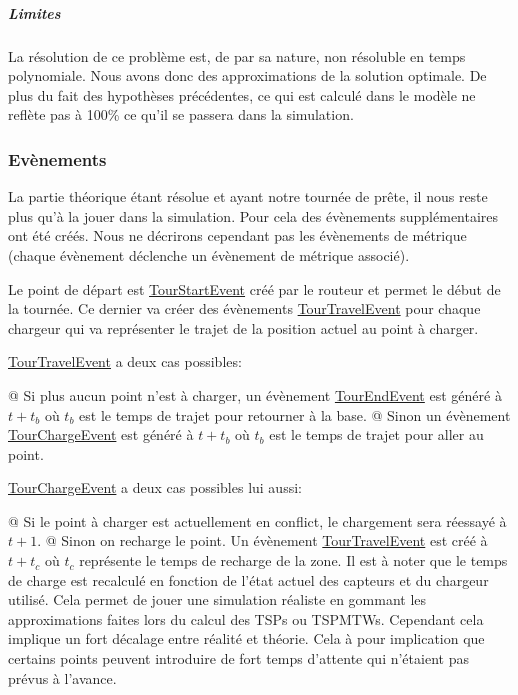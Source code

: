\documentclass[final]{polytech/polytech}
\newcommand{\klass}[1]{\hyperref[class:#1]{#1}}
\begin{document}
					\subparagraph{Limites}
						La résolution de ce problème est, de par sa nature, non résoluble en temps polynomiale.
						Nous avons donc des approximations de la solution optimale.
						De plus du fait des hypothèses précédentes, ce qui est calculé dans le modèle ne reflète pas à 100\% ce qu'il se passera dans la simulation.
			
			\subsubsection{Evènements}
				La partie théorique étant résolue et ayant notre tournée de prête, il nous reste plus qu'à la jouer dans la simulation.
				Pour cela des évènements supplémentaires ont été créés.
				Nous ne décrirons cependant pas les évènements de métrique (chaque évènement déclenche un évènement de métrique associé).
				
				Le point de départ est \klass{TourStartEvent} créé par le routeur et permet le début de la tournée.
				Ce dernier va créer des évènements \klass{TourTravelEvent} pour chaque chargeur qui va représenter le trajet de la position actuel au point à charger.
				
				\klass{TourTravelEvent} a deux cas possibles:
				\begin{easylist}
					@ Si plus aucun point n'est à charger, un évènement \klass{TourEndEvent} est généré à $t+t_b$ où $t_b$ est le temps de trajet pour retourner à la base.
					@ Sinon un évènement \klass{TourChargeEvent} est généré à $t+t_b$ où $t_b$ est le temps de trajet pour aller au point.
				\end{easylist}
				
				\klass{TourChargeEvent} a deux cas possibles lui aussi:
				\begin{easylist}
					@ Si le point à charger est actuellement en conflict, le chargement sera réessayé à $t+1$.
					@ Sinon on recharge le point. Un évènement \klass{TourTravelEvent} est créé à $t+t_c$ où $t_c$ représente le temps de recharge de la zone. Il est à noter que le temps de charge est recalculé en fonction de l'état actuel des capteurs et du chargeur utilisé. Cela permet de jouer une simulation réaliste en gommant les approximations faites lors du calcul des TSPs ou TSPMTWs. Cependant cela implique un fort décalage entre réalité et théorie. Cela à pour implication que certains points peuvent introduire de fort temps d'attente qui n'étaient pas prévus à l'avance.
				\end{easylist}
				
\end{document}
